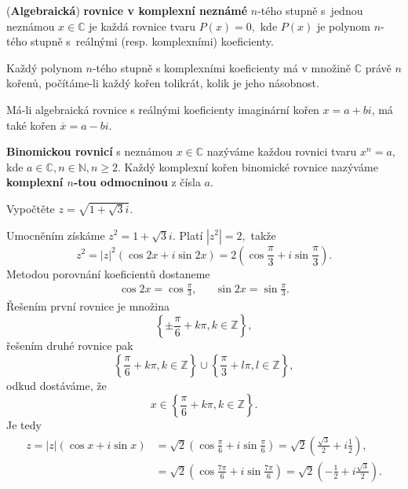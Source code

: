 \begin{definition}
(\textbf{Algebraická}) \textbf{rovnice v komplexní neznámé} $n$-tého stupně s~jednou neznámou $x\in \mathbb C$ je každá
rovnice tvaru $P(x)=0,$ kde $P(x)$ je polynom $n$-tého stupně s~reálnými (resp.
komplexními) koeficienty.
\end{definition}

\begin{veta}
    Každý polynom $n$-tého stupně s komplexními koeficienty má v množině $\mathbb C$
    právě $n$ kořenů, počítáme-li každý kořen tolikrát, kolik je jeho násobnost.
\end{veta}

\begin{veta}
    Má-li algebraická rovnice s reálnými koeficienty imaginární kořen
    $x = a+bi$, má také kořen $\overline{x} = a-bi.$
\end{veta}

\begin{definition}
\textbf{Binomickou rovnicí} s neznámou $x\in \mathbb C$ nazýváme každou rovnici
tvaru $x^n=a$, kde $a\in \mathbb C,n\in \mathbb N, n\geq 2.$ Každý komplexní
kořen binomické rovnice nazýváme \textbf{komplexní $n$-tou odmocninou} z čísla $a.$
\end{definition}

\begin{priklad}\label{prikladkompl}
Vypočtěte $z=\sqrt{1+\sqrt{3}i }. $
\end{priklad}

\begin{reseni}
Umocněním získáme $z^2=1+\sqrt{3}i. $ Platí $|z^2|=2,$ takže
$$z^2=|z|^2(\cos 2x+i\sin 2x)=2\left (\cos \frac{\pi}{3}+i\sin \frac{\pi}{3}\right).$$
Metodou porovnání koeficientů dostaneme
\begin{align*}
	\cos 2x = \cos \frac{\pi}{3}, && \sin 2x = \sin \frac{\pi}{3}.
\end{align*}
Řešením první rovnice je množina
$$
\left \{ \pm \frac{\pi}{6} + k\pi, k \in \mathbb Z  \right \},
$$
řešením druhé rovnice pak
$$
\left \{ \frac{\pi}{6} + k\pi, k \in \mathbb Z  \right \} \cup \left \{ \frac{\pi}{3} + l\pi, l \in \mathbb Z  \right \} ,
$$
odkud dostáváme, že
$$
    x \in \left \{ \frac{\pi}{6} + k\pi, k \in \mathbb Z \right \}.
$$
Je tedy
\begin{align*}
z = |z|\left( \cos x + i\sin x \right ) &= \sqrt{2} \left( \cos \frac{\pi}{6} + i \sin \frac{\pi}{6} \right ) = \sqrt{2}\left (\frac{\sqrt{3}}{2} + i\frac{1}{2}\right), \\
&= \sqrt{2} \left( \cos \frac{7\pi}{6} + i \sin \frac{7\pi}{6} \right ) =  \sqrt{2} \left( -\frac{1}{2} + i \frac{\sqrt{3}}{2} \right ).
\end{align*}
\end{reseni}


